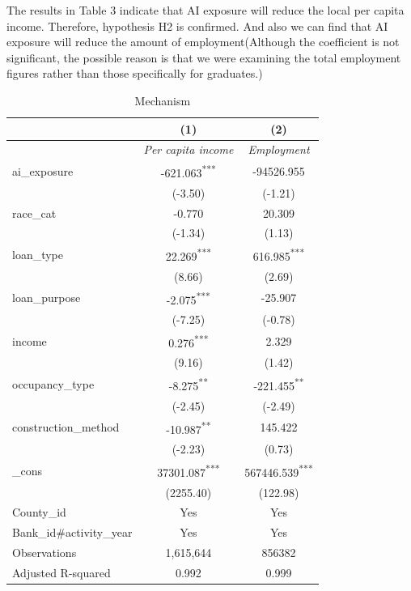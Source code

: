 \documentclass[11pt,a4paper]{article}
\begin{document}
The results in Table 3 indicate that AI exposure will reduce the local per capita income. Therefore, hypothesis H2 is confirmed. And also we can find that AI exposure will reduce the amount of employment(Although the coefficient is not significant, the possible reason is that we were examining the total employment figures rather than those specifically for graduates.)

\begin{table}[H]
\centering
\caption{Mechanism}
\label{tab:mechanism}
\small
\renewcommand{\arraystretch}{1.06}
\begin{tabular}{@{}lcc@{}}
\toprule
 & \textbf{(1)} & \textbf{(2)} \\
\midrule
 & \textit{Per capita income} & \textit{Employment} \\
\midrule
ai\_exposure & -621.063\textsuperscript{***} & -94526.955 \\
 & (-3.50) & (-1.21) \\
race\_cat & -0.770 & 20.309 \\
 & (-1.34) & (1.13) \\
loan\_type & 22.269\textsuperscript{***} & 616.985\textsuperscript{***} \\
 & (8.66) & (2.69) \\
loan\_purpose & -2.075\textsuperscript{***} & -25.907 \\
 & (-7.25) & (-0.78) \\
income & 0.276\textsuperscript{***} & 2.329 \\
 & (9.16) & (1.42) \\
occupancy\_type & -8.275\textsuperscript{**} & -221.455\textsuperscript{**} \\
 & (-2.45) & (-2.49) \\
construction\_method & -10.987\textsuperscript{**} & 145.422 \\
 & (-2.23) & (0.73) \\
\_cons & 37301.087\textsuperscript{***} & 567446.539\textsuperscript{***} \\
 & (2255.40) & (122.98) \\
County\_id & Yes & Yes \\
\addlinespace[2pt]
Bank\_id\#activity\_year & Yes & Yes \\
Observations & 1,615,644 & 856382 \\
Adjusted R-squared & 0.992 & 0.999 \\
\bottomrule
\end{tabular}
\end{table}
\end{document}
